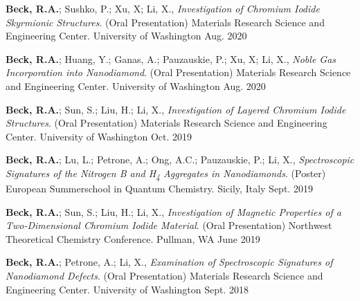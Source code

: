 

\begin{cvpresentations}

\cvpresentation %
{\textbf{Beck, R.A.}; Sushko, P.; Xu, X; Li, X., \textit{Investigation of Chromium Iodide Skyrmionic Structures}. (Oral Presentation) Materials Research Science and Engineering Center.}
{University of Washington} %
{Aug. 2020} %

\cvpresentation %
{\textbf{Beck, R.A.}; Huang, Y.; Ganas, A.; Pauzauskie, P.; Xu, X; Li, X., \textit{Noble Gas Incorporation into Nanodiamond}. (Oral Presentation) Materials Research Science and Engineering Center.}
{University of Washington} %
{Aug. 2020} %

\cvpresentation %
{\textbf{Beck, R.A.}; Sun, S.; Liu, H.; Li, X., \textit{Investigation of Layered Chromium Iodide Structures}. (Oral Presentation) Materials Research Science and Engineering Center.}
{University of Washington} %
{Oct. 2019} %


\cvpresentation %
{\textbf{Beck, R.A.}; Lu, L.; Petrone, A.; Ong, A.C.; Pauzauskie, P.; Li, X., \textit{Spectroscopic Signatures of the Nitrogen B and H\textsubscript{4} Aggregates in Nanodiamonds}. (Poster) European Summerschool in Quantum Chemistry.}
{Sicily, Italy} %
{Sept. 2019} %


\cvpresentation %
{\textbf{Beck, R.A.}; Sun, S.; Liu, H.; Li, X., \textit{Investigation of Magnetic Properties of a Two-Dimensional Chromium Iodide Material}. (Oral Presentation) Northwest Theoretical Chemistry Conference.}
{Pullman, WA} %
{June 2019} %


\cvpresentation %
{\textbf{Beck, R.A.}; Petrone, A.; Li, X., \textit{Examination of Spectroscopic Signatures of Nanodiamond Defects}. (Oral Presentation) Materials Research Science and Engineering Center.}
{University of Washington} %
{Sept. 2018} %



\end{cvpresentations}
